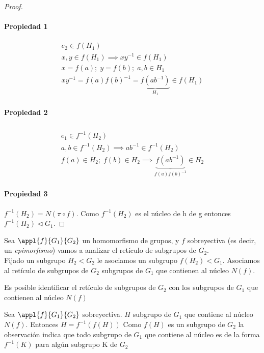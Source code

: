 \documentclass[nochap]{apuntes}
\begin{document}
\begin{proof}
\paragraph{Propiedad 1}
\begin{gather*}
e_2 \in f(H_1)\\
x, y\in f(H_1) \implies xy^{-1}\in f(H_1)\\
x=f(a);\; y = f(b);\; a, b\in H_1\\
xy^{-1}=f(a)f(b)^{-1} = \underbrace{f(ab^{-1})}_{H_1} \in f(H_1)
\end{gather*}

\paragraph{Propiedad 2}
\begin{gather*}
\\ e_1 \in f^{-1}(H_2)\\
a, b \in f^{-1}(H_2) \implies ab^{-1} \in f^{-1}(H_2)\\
f(a) \in H_2;\; f(b) \in H_2 \implies \underbrace{f(ab^{-1})}_{f(a)f(b)^{-1}}\in H_2
\end{gather*}

\paragraph{Propiedad 3}
$f^{-1}(H_2) = N(\pi \circ f)$. Como $f^{-1}(H_2)$ es el núcleo de h de g entonces $f^{-1}(H_2)\lhd G_1$.
\end{proof}


Sea $\appl{f}{G_1}{G_2}$ un homomorfismo de grupos, y $f$ sobreyectiva (es decir, un \textit{epimorfismo})
vamos a analizar el retículo de subgrupos de $G_2$.\\
Fijado un subgrupo $H_2<G_2$ le asociamos un subgrupo $f(H_2)<G_1$. Asociamos al retículo de subgrupos de $G_2$ subgrupos de $G_1$ que contienen al núcleo $N(f)$.
\begin{theorem}
Es posible identificar el retículo de subgrupos de $G_2$ con los subgrupos de $G_1$ que contienen al núcleo $N(f)$
\end{theorem}

\obs Sea $\appl{f}{G_1}{G_2}$ sobreyectiva. $H$ subgrupo de $G_1$ que contiene al núcleo $N(f)$. Entonces $H = f^{-1}(f(H))$
Como $f(H)$ es un subgrupo de $G_2$ la observación indica que todo subgrupo de $G_1$ que contiene al núcleo es de la forma $f^{-1}(K)$ para algún subgrupo K de $G_2$
\end{document}
